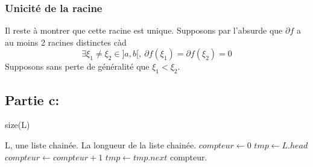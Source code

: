 \documentclass[a4paper, 12pt]{article}
\begin{document}
\subsubsection{Unicité de la racine}

Il reste à montrer que cette racine est unique. Supposons par l'absurde que \( \partial f \) a au moins 2 racines distinctes càd
$$
\exists \xi_1 \neq \xi_2 \in ]a, b[,~ \partial f(\xi_1) = \partial f(\xi_2) = 0
$$
Supposons sans perte de généralité que \( \xi_1 < \xi_2 \).


\newpage
\subsection{Partie c:}

\begin{algorithm}

\caption{size(L)}
\label{Modele pour un algo}

\begin{algorithmic}

\REQUIRE L, une liste chainée.
\ENSURE La longueur de la liste chainée.
\STATE $compteur \leftarrow 0$
\STATE $tmp \leftarrow L.head$
\STATE $compteur \leftarrow compteur + 1$
\STATE $tmp \leftarrow tmp.next$
\ENDWHILE
\RETURN compteur.

\end{algorithmic}

\end{algorithm}
\end{document}
